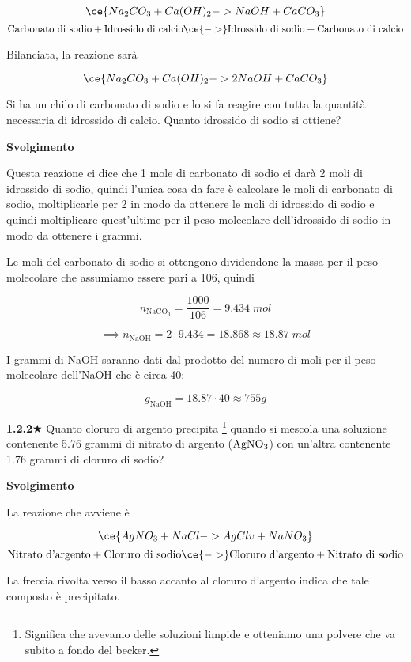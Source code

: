 $$\ce{Na_2CO_3 + Ca(OH)_2 -> NaOH + CaCO_3}$$
$$\text{Carbonato di sodio} + \text{Idrossido di calcio} \ce{->} \text{Idrossido di sodio} + \text{Carbonato di calcio}$$

Bilanciata, la reazione sarà

$$\ce{Na_2CO_3 + Ca(OH)_2 -> 2NaOH + CaCO_3}$$

Si ha un chilo di carbonato di sodio e lo si fa reagire con tutta la quantità necessaria di idrossido di calcio. Quanto idrossido di sodio si ottiene?

\vspace{0.2cm}\large\textbf{Svolgimento}\normalsize

\vspace{0.2cm}Questa reazione ci dice che 1 mole di carbonato di sodio ci darà 2 moli di idrossido di sodio, quindi l'unica cosa da fare è calcolare le moli di carbonato di sodio, moltiplicarle per 2 in modo da ottenere le moli di idrossido di sodio e quindi moltiplicare quest'ultime per il peso molecolare dell'idrossido di sodio in modo da ottenere i grammi.

Le moli del carbonato di sodio si ottengono dividendone la massa per il peso molecolare che assumiamo essere pari a 106, quindi

$$n_{\text{NaCO}_3}=\frac{1000}{106}=9.434 \; mol$$

$$\implies n_{\text{NaOH}}=2 \cdot 9.434=18.868 \approx 18.87 \; mol$$

I grammi di NaOH saranno dati dal prodotto del numero di moli per il peso molecolare dell'NaOH che è circa 40:

$$g_{\text{NaOH}}=18.87 \cdot 40 \approx 755 g$$


\textbf{1.2.2}$\bigstar$ Quanto cloruro di argento precipita \footnote{Significa che avevamo delle soluzioni limpide e otteniamo una polvere che va subito a fondo del becker.} quando si mescola una soluzione contenente 5.76 grammi di nitrato di argento ($\rm AgNO_3$) con un'altra contenente 1.76 grammi di cloruro di sodio?

\vspace{0.2cm}\large\textbf{Svolgimento}\normalsize

\vspace{0.2cm}La reazione che avviene è

$$\ce{AgNO_3 + NaCl -> AgCl v + NaNO_3}$$
$$\text{Nitrato d'argento} + \text{Cloruro di sodio} \ce{->} \text{Cloruro d'argento} + \text{Nitrato di sodio}$$

La freccia rivolta verso il basso accanto al cloruro d'argento indica che tale composto è precipitato.

